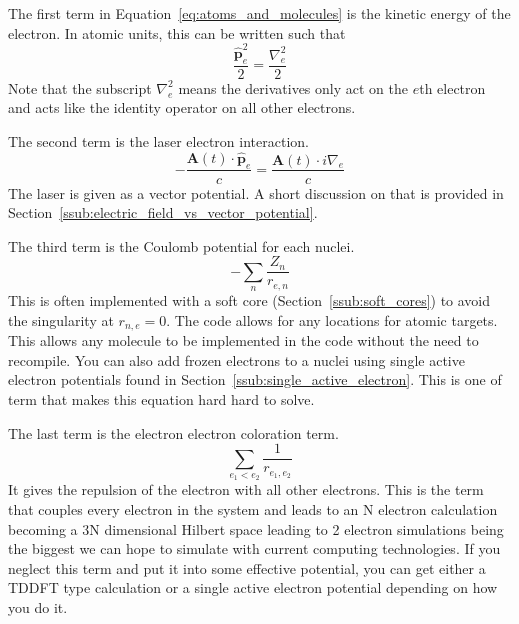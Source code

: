 \documentclass{article}
\begin{document}
The first term in Equation~\ref{eq:atoms_and_molecules} is the kinetic energy of the electron. In atomic units, this can be written such that
\begin{equation}
  \frac{\hat{\mathbf{p}}^2_e}{2} = \frac{\nabla_e^2}{2}
\end{equation}
Note that the subscript $\nabla_e^2$ means the derivatives only act on the $e$th electron and acts like the identity operator on all other electrons.

The second term is the laser electron interaction.
\begin{equation}
  - \frac{\mathbf{A}(t) \cdot \hat{\mathbf{p}}_e}{c} = \frac{\mathbf{A}(t) \cdot i\nabla_e}{c}
\end{equation}
The laser is given as a vector potential. A short discussion on that is provided in Section~\ref{ssub:electric_field_vs_vector_potential}.

The third term is the Coulomb potential for each nuclei.
\begin{equation}
  - \sum_{n} \frac{Z_n}{r_{e,n}}
\end{equation}
This is often implemented with a soft core (Section~\ref{ssub:soft_cores}) to avoid the singularity at $r_{n,e}=0$. The code allows for any locations for atomic targets. This allows any molecule to be implemented in the code without the need to recompile. You can also add frozen electrons to a nuclei using single active electron potentials found in Section~\ref{ssub:single_active_electron}. This is one of term that makes this equation hard hard to solve.

The last term is the electron electron coloration term.
\begin{equation}
  \sum_{e_1 < e_2}\frac{1}{r_{e_1, e_2}}
\end{equation}
It gives the repulsion of the electron with all other electrons. This is the term that couples every electron in the system and leads to an N electron calculation becoming a 3N dimensional Hilbert space leading to 2 electron simulations being the biggest we can hope to simulate with current computing technologies. If you neglect this term and put it into some effective potential, you can get either a TDDFT type calculation or a single active electron potential depending on how you do it.
\end{document}
